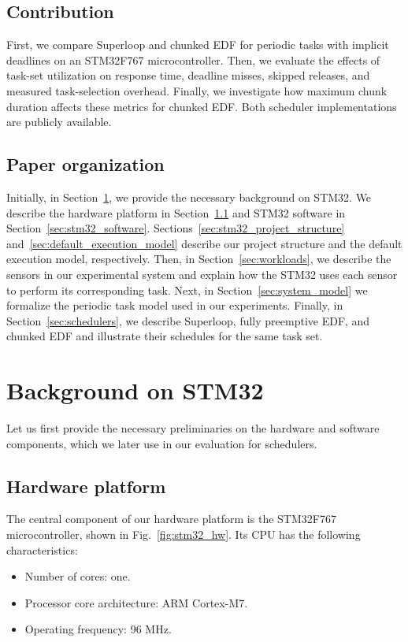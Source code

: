 \documentclass[conference]{IEEEtran}
\begin{document}
\subsection{Contribution}
First, we compare Superloop and chunked EDF for periodic tasks with implicit deadlines on an STM32F767 microcontroller. Then, we evaluate the effects of task-set utilization on response time, deadline misses, skipped releases, and measured task-selection overhead. Finally, we investigate how maximum chunk duration affects these metrics for chunked EDF. Both scheduler implementations are publicly available.



\subsection{Paper organization}

Initially, in Section~\ref{sec:STM32_background}, we provide the necessary background on STM32. We describe the hardware platform in Section~\ref{sec:hw_components} and STM32 software in Section~\ref{sec:stm32_software}. Sections~\ref{sec:stm32_project_structure} and~\ref{sec:default_execution_model} describe our project structure and the default execution model, respectively. Then, in Section~\ref{sec:workloads}, we describe the sensors in our experimental system and explain how the STM32 uses each sensor to perform its corresponding task. Next, in Section~\ref{sec:system_model} we formalize the periodic task model used in our experiments. Finally, in Section~\ref{sec:schedulers}, we describe Superloop, fully preemptive EDF, and chunked EDF and illustrate their schedules for the same task set.








\section{Background on STM32}
\label{sec:STM32_background}

Let us first provide the necessary preliminaries on the hardware and software components, which we later use in our evaluation for schedulers.

\subsection{Hardware platform}
\label{sec:hw_components}

The central component of our hardware platform is the STM32F767 microcontroller, shown in Fig.~\ref{fig:stm32_hw}. Its CPU has the following characteristics:
%
\begin{itemize}
	\item Number of cores: one.
	\item Processor core architecture: ARM Cortex-M7.
	\item Operating frequency: 96 MHz.
\end{itemize}
\end{document}
